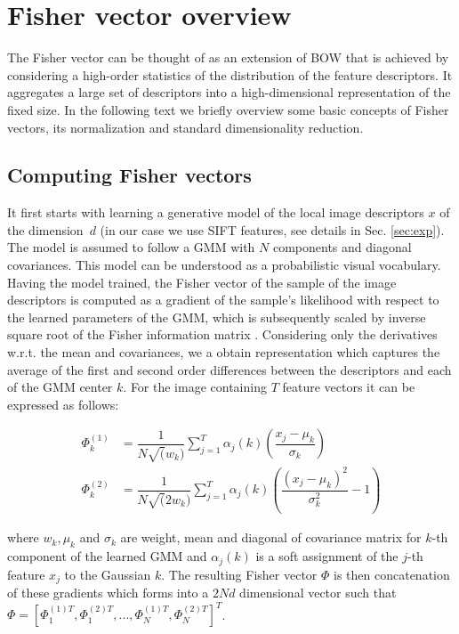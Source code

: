 \documentclass[table]{article} %
\begin{document}
\section{Fisher vector overview}
\label{sec:FV}
	The Fisher vector can be thought of as an extension of BOW \cite{Sivic03} that is achieved by considering a high-order statistics of the distribution of the feature descriptors. It aggregates a large set of descriptors into a high-dimensional representation of the fixed size. In the following text we briefly overview some basic concepts of Fisher vectors, its normalization and standard dimensionality reduction.

	\subsection{Computing Fisher vectors}
		It first starts with learning a generative model of the local image descriptors $x$ of the dimension~$d$ (in our case we use SIFT features, see details in Sec. \ref{sec:exp}). The model is assumed to follow a GMM with $N$ components and diagonal covariances. This model can be understood as a probabilistic visual vocabulary. Having the model trained, the Fisher vector of the sample of the image descriptors is computed as a gradient of the sample's likelihood with respect to the learned parameters of the GMM, which is subsequently scaled by inverse square root of the Fisher information matrix \cite{Perronnin2007}. Considering only the derivatives w.r.t. the mean and covariances, we a obtain representation which captures the average of the first and second order differences between the descriptors and each of the GMM center $k$. For the image containing $T$ feature vectors it can be expressed as follows:
		
		\begin{align}
			\Phi^{(1)}_k&=
			\dfrac{1}{N \sqrt(w_k)}\sum_{j=1}^{T} \alpha_j(k) \left(
			\dfrac{x_j-\mu_k}{\sigma_k}
			\right)
			\label{eq:FVmean}
			\\
			\Phi^{(2)}_k&=
			\dfrac{1}{N \sqrt(2w_k)}\sum_{j=1}^{T} \alpha_j(k) \left(
			\dfrac{(x_j-\mu_k)^2}{\sigma_k^2}-1 
			\right)
			\label{eq:FVvar}
		\end{align}

		\noindent
		where $w_k, \mu_k$ and $\sigma_k$ are weight, mean and diagonal of covariance matrix for $k$-th component of the learned GMM and $\alpha_j(k)$ is a soft assignment of the $j$-th feature $x_j$ to the Gaussian $k$. The resulting Fisher vector  $\Phi$ is then concatenation of these gradients which forms into a $2Nd$ dimensional vector such that $\Phi=[\Phi^{(1)T}_1,\Phi^{(2)T}_1,...,\Phi^{(1)T}_N,\Phi^{(2)T}_N]^T$.
\end{document}
